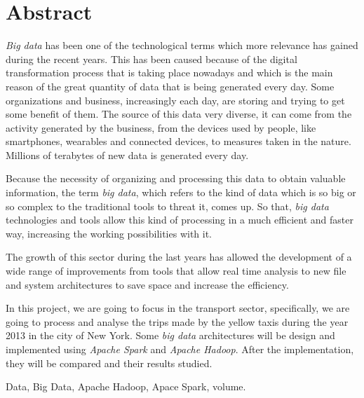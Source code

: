 \chapter*{Abstract}

\begin{abstractEn}
\textit{Big data} has been one of the technological terms which more relevance has gained during the recent years. This has been caused because of the digital transformation process that is taking place nowadays and which is the main reason of the great quantity of data that is being generated every day. Some organizations and business, increasingly each day, are storing and trying to get some benefit of them. The source of this data very diverse, it can come from the activity generated by the business, from the devices used by people, like smartphones, wearables and connected devices, to measures taken in the nature. Millions of terabytes of new data is generated every day.

Because the necessity of organizing and processing this data to obtain valuable information, the term \textit{big data}, which refers to the kind of data which is so big or so complex to the traditional tools to threat it, comes up. So that, \textit{big data} technologies and tools allow this kind of processing in a much efficient and faster way, increasing the working possibilities with it.

The growth of this sector during the last years has allowed the development of a wide range of improvements from tools that allow real time analysis to new file and system architectures to save space and increase the efficiency.

In this project, we are going to focus in the transport sector, specifically, we are going to process and analyse the trips made by the yellow taxis during the year 2013 in the city of New York. Some \textit{big data} architectures will be design and implemented using \textit{Apache Spark} and \textit{Apache Hadoop}. After the implementation, they will be compared and their results studied.


\end{abstractEn}

\begin{keywordsEn}
Data, Big Data, Apache Hadoop, Apace Spark, volume.
\end{keywordsEn}
